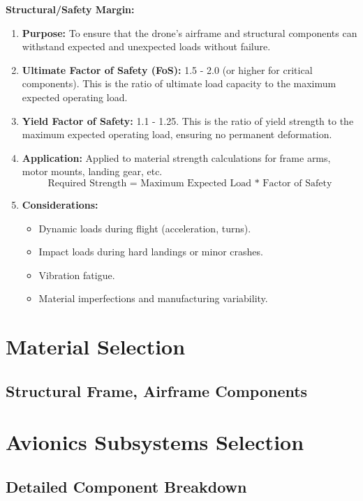 \documentclass[12pt]{report}
\begin{document}
        \noindent \textbf{\large Structural/Safety Margin:} \\
        \begin{enumerate}
          \item \textbf{Purpose:} To ensure that the drone's airframe and structural components can withstand expected and unexpected loads without failure.
          \item \textbf{Ultimate Factor of Safety (FoS):} 1.5 - 2.0 (or higher for critical components). This is the ratio of ultimate load capacity to the maximum expected operating load.
          \item \textbf{Yield Factor of Safety:} 1.1 - 1.25. This is the ratio of yield strength to the maximum expected operating load, ensuring no permanent deformation.
          \item \textbf{Application:} Applied to material strength calculations for frame arms, motor mounts, landing gear, etc. \[ \text{Required Strength = Maximum Expected Load * Factor of Safety} \]
          \item \textbf{Considerations:}
            \begin{itemize}
              \item Dynamic loads during flight (acceleration, turns).
              \item Impact loads during hard landings or minor crashes.
              \item Vibration fatigue.
              \item Material imperfections and manufacturing variability.
            \end{itemize}
        \end{enumerate}

        

    \section{Material Selection}
      \subsection{Structural Frame, Airframe Components}
    

    \section{Avionics Subsystems Selection}
      \subsection{Detailed Component Breakdown}
\end{document}
